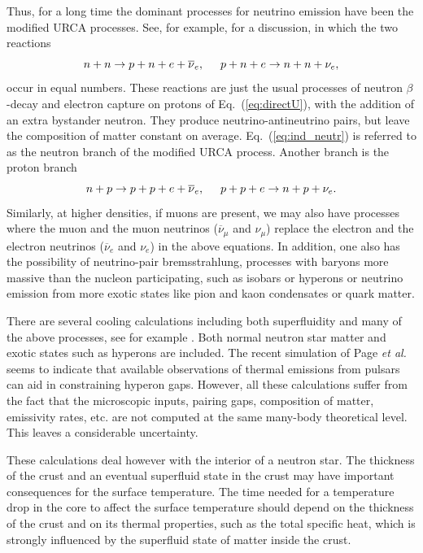 \documentclass[rmp,aps,floatfix]{revtex4}
\begin{document}
Thus, for a long time the dominant processes for neutrino emission
have been the modified URCA processes.
See, for example, \cite{pethick1992,nstar} for a discussion, 
in which the two reactions
\begin{equation}
    n+n\rightarrow p+n +e +\overline{\nu}_e,
    \hspace{0.5cm} p+n+e \rightarrow
    n+n+\nu_e ,
    \label{eq:ind_neutr}
\end{equation}
occur in equal numbers.
These reactions are just the usual processes of neutron
$\beta$-decay and electron capture on protons of Eq.\ (\ref{eq:directU}),
with the addition of an extra bystander neutron. They produce
neutrino-antineutrino pairs, but leave the composition of matter constant
on average. Eq.\ (\ref{eq:ind_neutr}) is referred to as the
neutron branch of the modified URCA process. Another branch is the
proton branch
\begin{equation}
    n+p\rightarrow p+p +e +\overline{\nu}_e, \hspace{0.5cm} p+p+e
    \rightarrow
    n+p+\nu_e .
    \label{eq:ind_prot}
\end{equation}
Similarly, at higher densities, if muons are present, we may also
have  processes where the muon and the muon neutrinos 
($\overline{\nu}_{\mu}$ and $\nu_{\mu}$) 
replace the electron and the electron neutrinos
($\overline{\nu}_e$ and $\nu_e$) in the above equations.
In addition, one also has the possibility of neutrino-pair
bremsstrahlung,
processes with baryons more massive than the nucleon
participating, such as isobars or hyperons
or neutrino emission from more exotic states like pion and kaon
condensates or quark matter.

There are 
several cooling calculations including both superfluidity and many of 
the above processes, see for example \cite{page2000,schaab1996a,schaab1996b}. Both
normal neutron star matter and exotic states such as hyperons are included. 
The recent simulation of Page {\em et al.} \cite{page2000} seems to indicate
that available observations of thermal emissions from pulsars can aid
in constraining hyperon gaps. However, all these calculations suffer from the
fact that the microscopic inputs, pairing gaps, composition of matter, emissivity rates, etc.
are not computed at the same many-body theoretical level. This leaves a 
considerable uncertainty. 
  
These calculations deal however with the interior of a neutron star.
The thickness of the crust and an eventual superfluid state in the crust
may have important consequences for the surface temperature.
The time needed for a 
temperature drop in the core to affect the surface temperature should 
depend on the thickness of the crust and on its thermal properties, such 
as the total specific heat, which is strongly influenced 
by the superfluid state of matter inside the crust.
\end{document}
